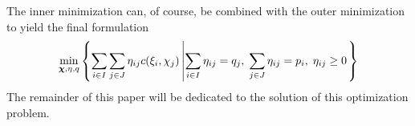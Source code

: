 The inner minimization can, of course, be combined with the outer minimization to yield the final formulation
\begin{equation}
  \label{eq:symbolic-optimization-with-minflow2}
  \min_{\boldsymbol\chi,\eta,q}\left\{\sum_{i\in I}\sum_{j\in J}\eta_{ij}c(\xi_i,\chi_j)\left|\sum_{i\in I}\eta_{ij}=q_j,\;\sum_{j\in J}\eta_{ij}=p_i,\;\eta_{ij}\geq 0\right.\right\}
\end{equation}
The remainder of this paper will be dedicated to the solution of this optimization problem.
\begin{comment}
\subsubsection{Tree Feasibility Sets}
\label{sec:tree-feas-sets}
In this section, the two feasibility sets $\mathcal{T}$ for scenario trees used in this paper are discussed.
These are the so called \textbf{discrete-event} trees and \textbf{continuous-event} trees.
The former are the model used in the prominent literature \cite{Dupacova2003} and related papers.
The notion of continuous-event trees is not discussed in any of the cited papers, but will prove to be a powerful concept.

A tree structure can be defined by the number of stages $n_s$ and the number of children (branches) $n_c$ to each node.
For a tree defined in that way, the number of scenarios in this tree (which is the same as the number of leaf nodes) is
\begin{equation}
  \label{eq:number-of-leaf-nodes}
  n_L = n_c^{n_s-1}.
\end{equation}
The number of nodes in the tree can be computed with the formula for the geometric series
\begin{equation}
  \label{eq:number-of-nodes}
  n_N = \frac{1-n_c^{n_s}}{1-n_c}
\end{equation}
\paragraph{Discrete-Event Trees} Consider a study on the robustness of a plane-based mail delivery system to cancellation of flights.
A large database of failures is available that can be used as data to form the initial stochastic process.
The next step is to generate a scenario tree from this data.
In order to evaluate the quality of a scenario tree, a metric for the space of all possible events is necessary.
This discrete space does not have a natural underlying metric space.
The metric must therefore be hand-crafted to fit this purpose.
For each pair of events, a \textbf{dissimilarity measure} must be provided.
Note that the tree generation algorithm will base its decision whether or not to aggregate scenarios o the values of the dissimilarity measure.
The modeling and optimization process therefore starts with this step.


\end{comment}
